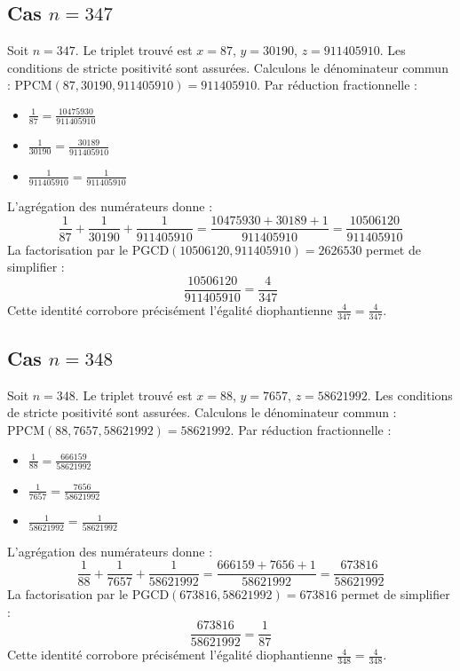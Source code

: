 \documentclass[11pt,a4paper]{article}
\begin{document}
\subsection{Cas $n = 347$}
Soit $n = 347$. Le triplet trouvé est $x = 87$, $y = 30190$, $z = 911405910$.
Les conditions de stricte positivité sont assurées.
Calculons le dénominateur commun : $\text{PPCM}(87, 30190, 911405910) = 911405910$.
Par réduction fractionnelle :
\begin{itemize}
    \item $\frac{1}{87} = \frac{10475930}{911405910}$
    \item $\frac{1}{30190} = \frac{30189}{911405910}$
    \item $\frac{1}{911405910} = \frac{1}{911405910}$
\end{itemize}
L'agrégation des numérateurs donne :
$$ \frac{1}{87} + \frac{1}{30190} + \frac{1}{911405910} = \frac{10475930 + 30189 + 1}{911405910} = \frac{10506120}{911405910} $$
La factorisation par le $\text{PGCD}(10506120, 911405910) = 2626530$ permet de simplifier :
$$ \frac{10506120}{911405910} = \frac{4}{347} $$
Cette identité corrobore précisément l'égalité diophantienne $\frac{4}{347} = \frac{4}{347}$.

\subsection{Cas $n = 348$}
Soit $n = 348$. Le triplet trouvé est $x = 88$, $y = 7657$, $z = 58621992$.
Les conditions de stricte positivité sont assurées.
Calculons le dénominateur commun : $\text{PPCM}(88, 7657, 58621992) = 58621992$.
Par réduction fractionnelle :
\begin{itemize}
    \item $\frac{1}{88} = \frac{666159}{58621992}$
    \item $\frac{1}{7657} = \frac{7656}{58621992}$
    \item $\frac{1}{58621992} = \frac{1}{58621992}$
\end{itemize}
L'agrégation des numérateurs donne :
$$ \frac{1}{88} + \frac{1}{7657} + \frac{1}{58621992} = \frac{666159 + 7656 + 1}{58621992} = \frac{673816}{58621992} $$
La factorisation par le $\text{PGCD}(673816, 58621992) = 673816$ permet de simplifier :
$$ \frac{673816}{58621992} = \frac{1}{87} $$
Cette identité corrobore précisément l'égalité diophantienne $\frac{4}{348} = \frac{4}{348}$.
\end{document}
